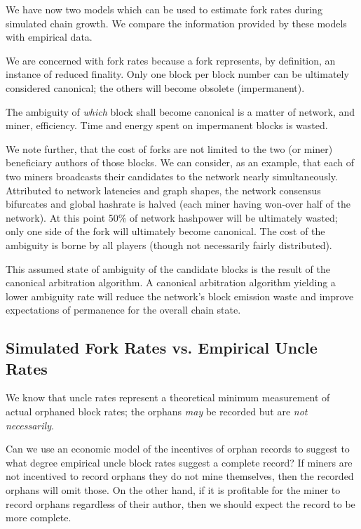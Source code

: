 \documentclass[11pt]{article}
\theoremstyle{plain}
\begin{document}
{We have now two models which can be used to estimate fork rates during
simulated chain growth. We compare the information provided by these models with
empirical data.

We are concerned with fork rates because a fork represents, by definition, an
instance of reduced finality. Only one block per block number can be ultimately
considered canonical; the others will become obsolete (impermanent).

The ambiguity of \emph{which} block shall become canonical is a matter of
network, and miner, efficiency. Time and energy spent on impermanent blocks is 
wasted.

We note further, that the cost of forks are not limited to the two (or miner)
beneficiary authors of those blocks. We can consider, as an example, that each
of two miners broadcasts their candidates to the network nearly simultaneously.
Attributed to network latencies and graph shapes, the network consensus bifurcates
and global hashrate is halved (each miner having won-over half of the network).
At this point 50\% of network hashpower will be ultimately wasted; only one
side of the fork will ultimately become canonical. The cost of the ambiguity is
borne by all players (though not necessarily fairly distributed).

This assumed state of ambiguity of the candidate blocks is the result of the
canonical arbitration algorithm. A canonical arbitration algorithm yielding a
lower ambiguity rate will reduce the network's block emission waste and improve
expectations of permanence for the overall chain state.

\subsection{\normalsize{Simulated Fork Rates vs. Empirical Uncle Rates}}

We know that uncle rates represent a theoretical minimum measurement of actual
orphaned block rates; the orphans \emph{may} be recorded but are \emph{not
necessarily}.

Can we use an economic model of the incentives of orphan records to suggest to
what degree empirical uncle block rates suggest a complete record?
If miners are not incentived to record orphans they do not mine themselves,
then the recorded orphans will omit those. On the other hand, if it is
profitable for the miner to record orphans regardless of their author, then we
should expect the record to be more complete.

}
\end{document}
